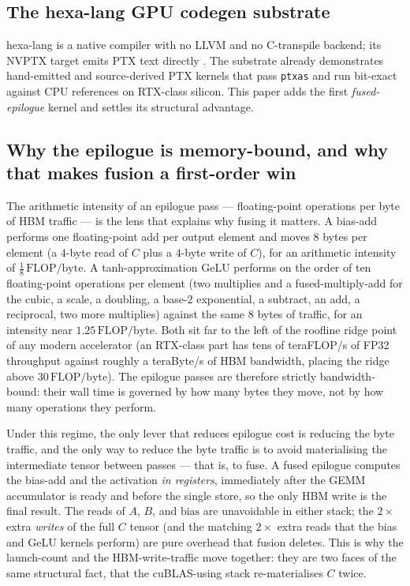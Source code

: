 \documentclass[11pt,a4paper]{article}
\begin{document}
\subsection{The hexa-lang GPU codegen substrate}

hexa-lang is a native compiler with no LLVM and no C-transpile backend; its
NVPTX target emits PTX text directly \citep{hexalang2026gpu}. The substrate
already demonstrates hand-emitted and source-derived PTX kernels that pass
\texttt{ptxas} and run bit-exact against CPU references on RTX-class silicon.
This paper adds the first \emph{fused-epilogue} kernel and settles its
structural advantage.

\subsection{Why the epilogue is memory-bound, and why that makes fusion a
first-order win}
\label{sec:roofline}

The arithmetic intensity of an epilogue pass --- floating-point operations per
byte of HBM traffic --- is the lens that explains why fusing it matters. A
bias-add performs one floating-point add per output element and moves
$8$ bytes per element (a $4$-byte read of $C$ plus a $4$-byte write of $C$),
for an arithmetic intensity of $\tfrac{1}{8}\,\mathrm{FLOP/byte}$. A
tanh-approximation GeLU performs on the order of ten floating-point operations
per element (two multiplies and a fused-multiply-add for the cubic, a scale, a
doubling, a base-$2$ exponential, a subtract, an add, a reciprocal, two more
multiplies) against the same $8$ bytes of traffic, for an intensity near
$1.25\,\mathrm{FLOP/byte}$. Both sit far to the left of the roofline ridge
point of any modern accelerator (an RTX-class part has tens of teraFLOP/s of
FP32 throughput against roughly a teraByte/s of HBM bandwidth, placing the
ridge above $30\,\mathrm{FLOP/byte}$). The epilogue passes are therefore
strictly bandwidth-bound: their wall time is governed by how many bytes they
move, not by how many operations they perform.

Under this regime, the only lever that reduces epilogue cost is reducing the
byte traffic, and the only way to reduce the byte traffic is to avoid
materialising the intermediate tensor between passes --- that is, to fuse. A
fused epilogue computes the bias-add and the activation \emph{in registers},
immediately after the GEMM accumulator is ready and before the single store,
so the only HBM write is the final result. The reads of $A$, $B$, and
$\mathrm{bias}$ are unavoidable in either stack; the $2\times$ extra
\emph{writes} of the full $C$ tensor (and the matching $2\times$ extra reads
that the bias and GeLU kernels perform) are pure overhead that fusion deletes.
This is why the launch-count and the HBM-write-traffic move together: they are
two faces of the same structural fact, that the cuBLAS-using stack
re-materialises $C$ twice.
\end{document}
